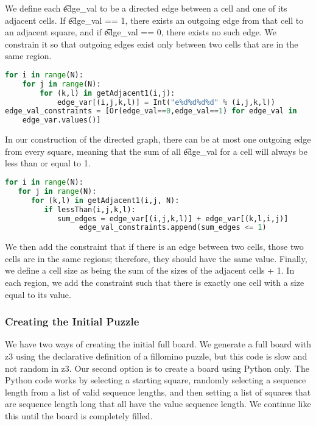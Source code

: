 We define each \t{edge\_val} to be a directed edge between a cell and
one of its adjacent cells. If \t{edge\_val == 1}, there exists an
outgoing edge from that cell to an adjacent square, and if
\t{edge\_val == 0}, there exists no such edge. We constrain it so that
outgoing edges exist only between two cells that are in the same
region.

\singlespace
\begin{lstlisting}[language=python, frame=single]
for i in range(N):
    for j in range(N):
        for (k,l) in getAdjacent1(i,j):
            edge_var[(i,j,k,l)] = Int("e%d%d%d%d" % (i,j,k,l))
edge_val_constraints = [Or(edge_val==0,edge_val==1) for edge_val in
    edge_var.values()]
\end{lstlisting}
\doublespace

In our construction of the directed graph, there can be at most one outgoing edge from every square, meaning that the sum of all \t{edge\_val} for a cell will always be less than or equal to 1.

\singlespace
\begin{lstlisting}[language=python, frame=single]
for i in range(N):
   for j in range(N):
      for (k,l) in getAdjacent1(i,j, N):
         if lessThan(i,j,k,l):
            sum_edges = edge_var[(i,j,k,l)] + edge_var[(k,l,i,j)]
                 edge_val_constraints.append(sum_edges <= 1)
\end{lstlisting}
\doublespace

We then add the constraint that if there is an edge between two cells,
those two cells are in the same regions; therefore, they should have
the same value. Finally, we define a cell size as being the sum of the
sizes of the adjacent cells + 1. In each region, we add the constraint
such that there is exactly one cell with a size equal to its value.

\subsubsection{Creating the Initial Puzzle}
We have two ways of creating the initial full board. We generate a
full board with z3 using the declarative definition of a fillomino
puzzle, but this code is slow and not random in z3. Our second option
is to create a board using Python only. The Python code works by
selecting a starting square, randomly selecting a sequence length from
a list of valid sequence lengths, and then setting a list of squares
that are sequence length long that all have the value sequence
length. We continue like this until the board is completely filled.


